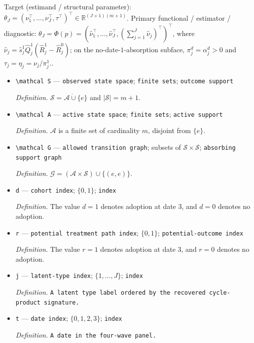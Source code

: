 \documentclass{article}
\begin{document}
Target (estimand / structural parameter): \(\theta_J=(\nu_1^\top,\ldots,\nu_J^\top,\tau^\top)^\top\in\mathbb R^{(J+1)(m+1)}\).
Primary functional / estimator / diagnostic: \(\theta_J=\Phi(p)=(\widehat\nu_1^\top,\ldots,\widehat\nu_J^\top,(\sum_{j=1}^J\widehat\nu_j)^\top)^\top\), where \(\widehat\nu_j=\widehat s_j^1\widehat Q_j^1(\widehat R_j^1-\widehat R_j^0)\); on the no-date-\(1\)-absorption subface, \(\pi_j^d=\alpha_j^d>0\) and \(\tau_j=\eta_j=\nu_j/\pi_j^1\)..
\begin{itemize}
  \item \texttt{\textbackslash{}\allowbreak{}mathcal S} --- \texttt{observed state space}; \texttt{finite sets}; \texttt{outcome support}
  \par\smallskip\noindent\emph{Definition.} \(\mathcal S=\mathcal A\mathbin{\dot\cup}\{e\}\) and \(|\mathcal S|=m+1\).
  \item \texttt{\textbackslash{}\allowbreak{}mathcal A} --- \texttt{active state space}; \texttt{finite sets}; \texttt{active support}
  \par\smallskip\noindent\emph{Definition.} \(\mathcal A\) is a finite set of cardinality \(m\), disjoint from \(\{e\}\).
  \item \texttt{\textbackslash{}\allowbreak{}mathcal G} --- \texttt{allowed transition graph}; subsets of \(\mathcal S\times\mathcal S\); \texttt{absorbing support graph}
  \par\smallskip\noindent\emph{Definition.} \(\mathcal G=(\mathcal A\times\mathcal S)\cup\{(e,e)\}\).
  \item \texttt{d} --- \texttt{cohort index}; \(\{0,1\}\); \texttt{index}
  \par\smallskip\noindent\emph{Definition.} The value \(d=1\) denotes adoption at date \(3\), and \(d=0\) denotes no adoption.
  \item \texttt{r} --- \texttt{potential treatment path index}; \(\{0,1\}\); \texttt{potential-\allowbreak{}outcome index}
  \par\smallskip\noindent\emph{Definition.} The value \(r=1\) denotes adoption at date \(3\), and \(r=0\) denotes no adoption.
  \item \texttt{j} --- \texttt{latent-\allowbreak{}type index}; \(\{1,\ldots,J\}\); \texttt{index}
  \par\smallskip\noindent\emph{Definition.} \texttt{A latent type label ordered by the recovered cycle-\allowbreak{}product signature.}
  \item \texttt{t} --- \texttt{date index}; \(\{0,1,2,3\}\); \texttt{index}
  \par\smallskip\noindent\emph{Definition.} \texttt{A date in the four-\allowbreak{}wave panel.}

\end{itemize}
\end{document}
